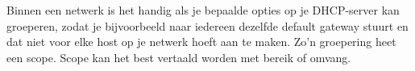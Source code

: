 Binnen een netwerk is het handig als je bepaalde opties op je DHCP-server kan groeperen, zodat je bijvoorbeeld naar iedereen dezelfde default gateway stuurt en dat niet voor elke host op je netwerk hoeft aan te maken. Zo'n groepering heet een scope. Scope kan het best vertaald worden met bereik of omvang.
